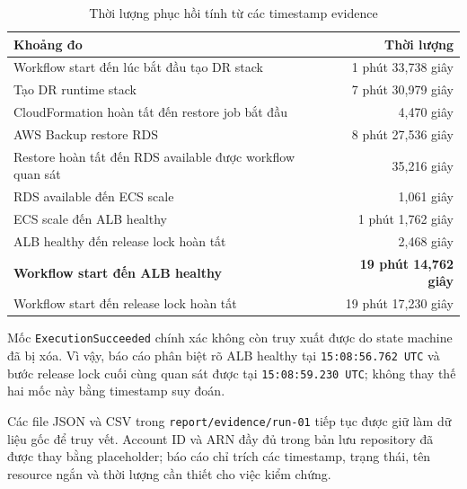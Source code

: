 \begin{table}[H]
\centering
\caption{Thời lượng phục hồi tính từ các timestamp evidence}
\label{tab:appendix-evidence-durations}
\small
\begin{tabularx}{\textwidth}{@{}Xr@{}}
\toprule
\textbf{Khoảng đo} & \textbf{Thời lượng} \\
\midrule
Workflow start đến lúc bắt đầu tạo DR stack & 1 phút 33,738 giây \\
Tạo DR runtime stack & 7 phút 30,979 giây \\
CloudFormation hoàn tất đến restore job bắt đầu & 4,470 giây \\
AWS Backup restore RDS & 8 phút 27,536 giây \\
Restore hoàn tất đến RDS available được workflow quan sát & 35,216 giây \\
RDS available đến ECS scale & 1,061 giây \\
ECS scale đến ALB healthy & 1 phút 1,762 giây \\
ALB healthy đến release lock hoàn tất & 2,468 giây \\
\midrule
\textbf{Workflow start đến ALB healthy} & \textbf{19 phút 14,762 giây} \\
Workflow start đến release lock hoàn tất & 19 phút 17,230 giây \\
\bottomrule
\end{tabularx}
\end{table}

Mốc \texttt{ExecutionSucceeded} chính xác không còn truy xuất được do state machine đã bị xóa. Vì vậy, báo cáo phân biệt rõ ALB healthy tại \texttt{15:08:56.762 UTC} và bước release lock cuối cùng quan sát được tại \texttt{15:08:59.230 UTC}; không thay thế hai mốc này bằng timestamp suy đoán.

Các file JSON và CSV trong \texttt{report/evidence/run-01} tiếp tục được giữ làm dữ liệu gốc để truy vết. Account ID và ARN đầy đủ trong bản lưu repository đã được thay bằng placeholder; báo cáo chỉ trích các timestamp, trạng thái, tên resource ngắn và thời lượng cần thiết cho việc kiểm chứng.
